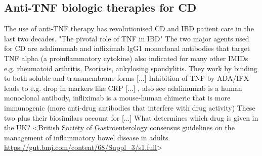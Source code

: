 \begin{outline}
\subsection{Anti-TNF biologic therapies for CD}

\1 The use of \gls{anti-TNF} therapy has revolutionised CD and IBD patient care in the last two decades.
\2 "The pivotal role of TNF in IBD" \autocite{digby-bell2019InterrogatingHostImmunity}
    \2 The two major agents used for CD are adalimumab and infliximab IgG1 monoclonal antibodies that target TNF alpha (a proinflammatory cytokine) \autocite{adegbola2018AntiTNFTherapyCrohn}
        \3 also indicated for many other IMIDs e.g. rheumatoid arthritis, Psoriasis, ankylosing spondylitis. \autocite{lichtenstein2013ComprehensiveReviewAntitumor,mulhearn2019UsingImmunophenotypePredict}
        \2 They work by binding to both soluble and transmembrane forms \autocite{lichtenstein2013ComprehensiveReviewAntitumor} [...]  \autocite{levin2016MechanismActionAntiTNF} 
    \2 Inhibition of TNF by ADA/IFX leads to e.g. drop in markers like CRP [...]  \autocite{levin2016MechanismActionAntiTNF}, also see \autocite{danese2015BiologicAgentsIBD,adegbola2018AntiTNFTherapyCrohn}
    \2 adalimumab is a human monoclonal antibody, infliximab is a mouse-human chimeric that is more immunogenic (more anti-drug antibodies that interfere with drug activity)
        \3 These two plus their biosimilars account for [...] 
    \2 What determines which drug is given in the UK? 
        \3 <British Society of Gastroenterology consensus guidelines on the management of inflammatory bowel disease in adults \url{https://gut.bmj.com/content/68/Suppl_3/s1.full}>

\end{outline}
